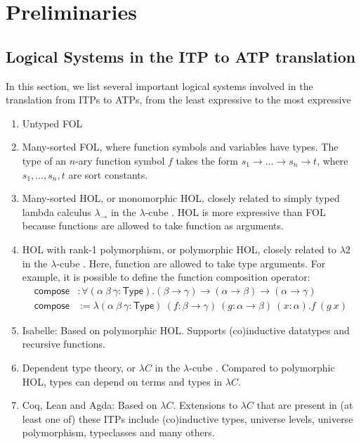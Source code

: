 \section{Preliminaries}

\subsection{Logical Systems in the ITP to ATP translation}\label{sublogsys}

  In this section, we list several important logical systems involved in the translation from
  ITPs to ATPs, from the least expressive to the most expressive
  \begin{enumerate}
    \item Untyped FOL
    \item Many-sorted FOL, where function symbols and variables have types. The type
      of an $n$-ary function symbol $f$ takes the form $s_1 \to \dots \to s_n \to t$,
      where $s_1, \dots, s_n, t$ are sort constants.
    \item Many-sorted HOL, or monomorphic HOL, closely related to simply typed lambda calculus
      $\lambda_\to$ in the $\lambda$-cube \cite{LambdaWithType}. HOL is more expressive than FOL because
      functions are allowed to take function as arguments.
    \item HOL with rank-1 polymorphism, or polymorphic HOL, closely related
      to $\lambda 2$ in the $\lambda$-cube \cite{LambdaWithType}. Here, function are
      allowed to take type arguments. For example, it is possible to define the function
      composition operator:
      $$\begin{aligned}
      \mathsf{compose} & : \forall (\alpha \ \beta \ \gamma : \mathsf{Type}). (\beta \to \gamma) \to (\alpha \to \beta) \to (\alpha \to \gamma) \\
      \mathsf{compose} & := \lambda (\alpha \ \beta \ \gamma : \mathsf{Type}) \ (f : \beta \to \gamma) \ (g : \alpha \to \beta) \ (x : \alpha). f \ (g \ x)
      \end{aligned}$$
    \item Isabelle: Based on polymorphic HOL. Supports (co)inductive datatypes and recursive functions.
    \item Dependent type theory, or $\lambda C$ in the $\lambda$-cube \cite{LambdaWithType}. Compared
      to polymorphic HOL, types can depend on terms and types in $\lambda C$.
    \item Coq, Lean and Agda: Based on $\lambda C$. Extensions to $\lambda C$ that are
      present in (at least one of) these ITPs include (co)inductive types, universe levels,
      universe polymorphism, typeclasses and many others.
  \end{enumerate}

